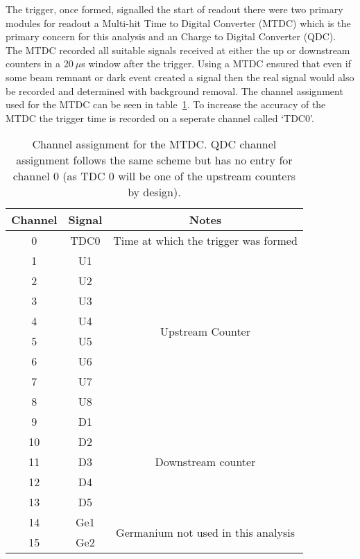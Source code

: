 \documentclass[]{article}
\newcommand{\ms}{$~\mu$s}
\begin{document}
The trigger, once formed, signalled the start of readout there were two primary modules for readout a Multi-hit Time to Digital Converter (MTDC) which is the primary concern for this analysis and an Charge to Digital Converter (QDC). The MTDC recorded all suitable signals received at either the up or downstream counters in a 20\ms{} window after the trigger. Using a MTDC ensured that even if some beam remnant or dark event created a signal then the real signal would also be recorded and determined with background removal. The channel assignment used for the MTDC can be seen in table~\ref{tab:mtdc_ch}. To increase the accuracy of the MTDC the trigger time is recorded on a seperate channel called `TDC0'.
\begin{table}
	\begin{center}
	\begin{tabular}{c|c|c}
		Channel & Signal & Notes\\
		\hline
		0  & TDC0 & Time at which the trigger was formed \\
		\hline
		1  & U1   & \multirow{8}{*}{Upstream Counter}\\
		2  & U2   & \\
		3  & U3   & \\
		4  & U4   & \\
		5  & U5   & \\
		6  & U6   & \\
		7  & U7   & \\
		8  & U8   & \\
		\hline
		9  & D1   & \multirow{5}{*}{Downstream counter}\\
		10 & D2   & \\
		11 & D3   & \\
		12 & D4   & \\
		13 & D5   & \\
		\hline
		14 & Ge1  & \multirow{2}{*}{Germanium not used in this analysis}\\
		15 & Ge2  & \\
	\end{tabular}
	\end{center}
	\caption{Channel assignment for the MTDC. QDC channel assignment follows the same scheme but has no entry for channel 0 (as TDC 0 will be one of the upstream counters by design).}
	\label{tab:mtdc_ch}
\end{table}
\end{document}

